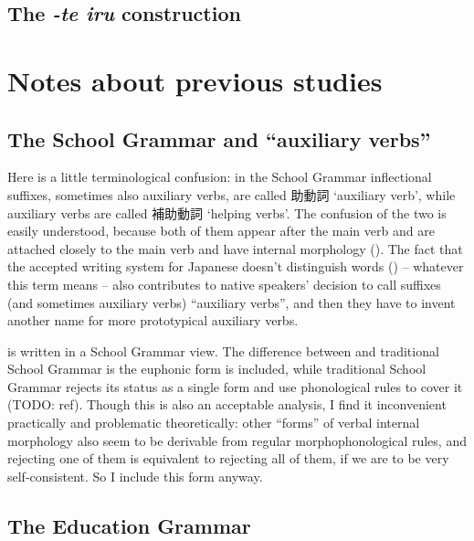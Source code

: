 \documentclass[UTF8, a4paper, oneside, scheme=plain]{ctexrep}
\newcommand{\corpus}[1]{\emph{#1}}
\newcommand{\translate}[1]{`#1'}
\begin{document}
\subsection{The \corpus{-te iru} construction}\label{sec:te-iru}




\section{Notes about previous studies}\label{sec:verb-complex-previous}

\subsection{The School Grammar and ``auxiliary verbs''}\label{sec:so-called-auxiliary-verb}

Here is a little terminological confusion:
in the School Grammar inflectional suffixes,
sometimes also auxiliary verbs, are called 助動詞 \translate{auxiliary verb},
while auxiliary verbs are called 補助動詞 \translate{helping verbs}.
The confusion of the two is easily understood,
because both of them appear after the main verb
and are attached closely to the main verb 
and have internal morphology ().
The fact that the accepted writing system for Japanese doesn't distinguish words 
() -- whatever this term means -- 
also contributes to native speakers' decision to call suffixes (and sometimes auxiliary verbs) ``auxiliary verbs'',
and then they have to invent another name for more prototypical auxiliary verbs.

 is written in a School Grammar view.
The difference between  and traditional School Grammar 
is the euphonic form is included,
while traditional School Grammar rejects its status as a single form
and use phonological rules to cover it (TODO: ref).
Though this is also an acceptable analysis,
I find it inconvenient practically and problematic theoretically:
other ``forms'' of verbal internal morphology also seem to
be derivable from regular morphophonological rules,
and rejecting one of them is equivalent to rejecting all of them,
if we are to be very self-consistent.
So I include this form anyway.

\subsection{The Education Grammar}
\end{document}
